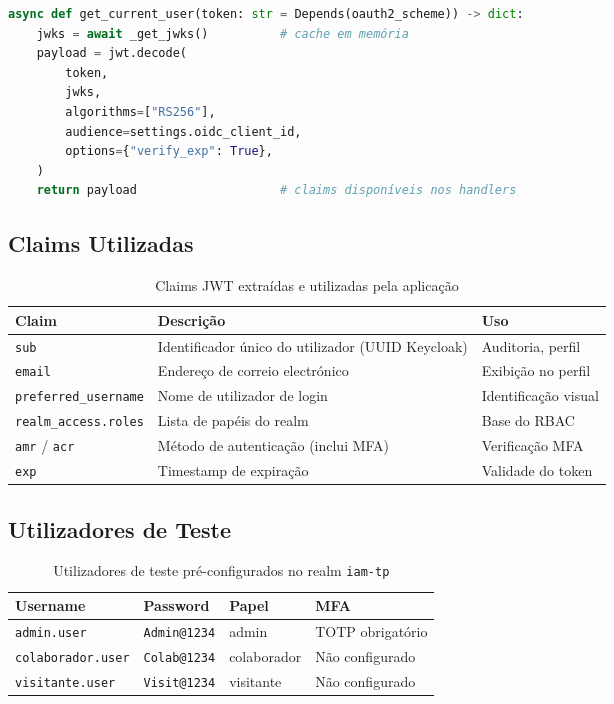 \documentclass[12pt,a4paper]{article}
\begin{document}
\begin{lstlisting}[language=python, caption=Lógica central de validação JWT em auth.py]
async def get_current_user(token: str = Depends(oauth2_scheme)) -> dict:
    jwks = await _get_jwks()          # cache em memória
    payload = jwt.decode(
        token,
        jwks,
        algorithms=["RS256"],
        audience=settings.oidc_client_id,
        options={"verify_exp": True},
    )
    return payload                    # claims disponíveis nos handlers
\end{lstlisting}

\subsection{Claims Utilizadas}

\begin{table}[H]
  \centering
  \caption{Claims JWT extraídas e utilizadas pela aplicação}
  \begin{tabularx}{\textwidth}{@{}lXl@{}}
    \toprule
    \textbf{Claim} & \textbf{Descrição} & \textbf{Uso} \\
    \midrule
    \texttt{sub} & Identificador único do utilizador (UUID Keycloak) & Auditoria, perfil \\
    \texttt{email} & Endereço de correio electrónico & Exibição no perfil \\
    \texttt{preferred\_username} & Nome de utilizador de login & Identificação visual \\
    \texttt{realm\_access.roles} & Lista de papéis do realm & Base do RBAC \\
    \texttt{amr} / \texttt{acr} & Método de autenticação (inclui MFA) & Verificação MFA \\
    \texttt{exp} & Timestamp de expiração & Validade do token \\
    \bottomrule
  \end{tabularx}
\end{table}

\subsection{Utilizadores de Teste}

\begin{table}[H]
  \centering
  \caption{Utilizadores de teste pré-configurados no realm \texttt{iam-tp}}
  \begin{tabular}{@{}llll@{}}
    \toprule
    \textbf{Username} & \textbf{Password} & \textbf{Papel} & \textbf{MFA} \\
    \midrule
    \texttt{admin.user} & \texttt{Admin@1234} & admin & TOTP obrigatório \\
    \texttt{colaborador.user} & \texttt{Colab@1234} & colaborador & Não configurado \\
    \texttt{visitante.user} & \texttt{Visit@1234} & visitante & Não configurado \\
    \bottomrule
  \end{tabular}
\end{table}
\end{document}

